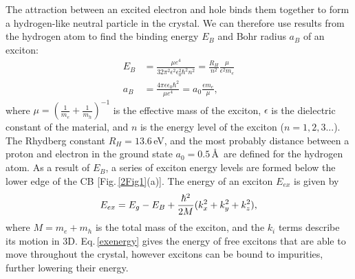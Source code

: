 The attraction between an excited electron and hole binds them together to form a hydrogen-like neutral particle in the crystal. We can therefore use results from the hydrogen atom to find the binding energy $E_B$ and Bohr radius $a_B$ of an exciton:
\begin{subequations}
\label{ex3D}
\begin{align}
E_B &=\frac{\mu e^4}{32\pi^2\epsilon^2\epsilon_0^2\hbar^2n^2} = \frac{R_H}{n^2}\frac{\mu}{\epsilon^2 m_e} \label{exbinding3D}\\
a_B &= \frac{4\pi\epsilon\epsilon_0\hbar^2}{\mu e^4}=a_0\frac{\epsilon m_e}{\mu} \label{exrad3D},
\end{align}
\end{subequations}
where $\mu = (\frac{1}{m_e}+\frac{1}{m_h})^{-1}$ is the effective mass of the exciton, $\epsilon$ is the dielectric constant of the material, and $n$ is the energy level of the exciton ($n=1, 2, 3...$). The Rhydberg constant $R_H=13.6$\,eV, and the most probably distance between a proton and electron in the ground state $a_0=0.5$\,\AA\, are defined for the hydrogen atom. As a result of $E_B$, a series of exciton energy levels are formed below the lower edge of the CB [Fig.\,\ref{2Fig1}(a)]. The energy of an exciton $E_{ex}$ is given by
\begin{equation}
\centering
E_{ex} = E_g - E_B + \frac{\hbar^2}{2M}(k_x^2+k_y^2+k_z^2),
\label{exenergy}
\end{equation}
where $M = m_e+m_h$ is the total mass of the exciton, and the $k_i$ terms describe its motion in 3D. Eq.\,\ref{exenergy} gives the energy of free excitons that are able to move throughout the crystal, however excitons can be bound to impurities, further lowering their energy.

